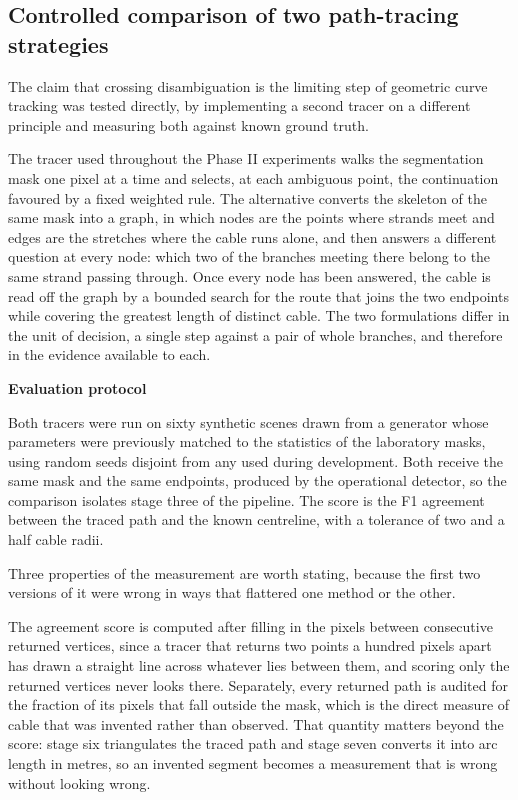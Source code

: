 \subsection{Controlled comparison of two path-tracing strategies}
\label{subsec:tracer-comparison}

The claim that crossing disambiguation is the limiting step of geometric curve tracking was tested directly, by implementing a second tracer on a different principle and measuring both against known ground truth.

The tracer used throughout the Phase II experiments walks the segmentation mask one pixel at a time and selects, at each ambiguous point, the continuation favoured by a fixed weighted rule. The alternative converts the skeleton of the same mask into a graph, in which nodes are the points where strands meet and edges are the stretches where the cable runs alone, and then answers a different question at every node: which two of the branches meeting there belong to the same strand passing through. Once every node has been answered, the cable is read off the graph by a bounded search for the route that joins the two endpoints while covering the greatest length of distinct cable. The two formulations differ in the unit of decision, a single step against a pair of whole branches, and therefore in the evidence available to each.

\vspace{0.2cm}
\noindent \textbf{Evaluation protocol}
\vspace{0.2cm}

Both tracers were run on sixty synthetic scenes drawn from a generator whose parameters were previously matched to the statistics of the laboratory masks, using random seeds disjoint from any used during development. Both receive the same mask and the same endpoints, produced by the operational detector, so the comparison isolates stage three of the pipeline. The score is the F1 agreement between the traced path and the known centreline, with a tolerance of two and a half cable radii.

Three properties of the measurement are worth stating, because the first two versions of it were wrong in ways that flattered one method or the other.

The agreement score is computed after filling in the pixels between consecutive returned vertices, since a tracer that returns two points a hundred pixels apart has drawn a straight line across whatever lies between them, and scoring only the returned vertices never looks there. Separately, every returned path is audited for the fraction of its pixels that fall outside the mask, which is the direct measure of cable that was invented rather than observed. That quantity matters beyond the score: stage six triangulates the traced path and stage seven converts it into arc length in metres, so an invented segment becomes a measurement that is wrong without looking wrong.

